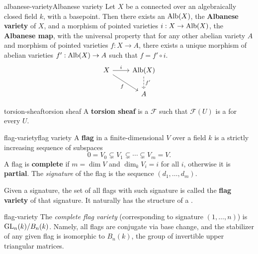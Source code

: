 \begin{topic}{albanese-variety}{Albanese variety}
    Let $X$ be a connected   over an algebraically closed field $k$, with a basepoint. Then there exists an  $\textup{Alb}(X)$, the \textbf{Albanese variety} of $X$, and a morphism of pointed varieties $i : X \to \textup{Alb}(X)$, the \textbf{Albanese map}, with the universal property that for any other abelian variety $A$ and morphism of pointed varieties $f : X \to A$, there exists a unique morphism of abelian varieties $f' : \textup{Alb}(X) \to A$ such that $f = f' \circ i$.
    \[ \begin{tikzcd} X \arrow{r}{i} \arrow[swap]{dr}{f} &  \textup{Alb}(X) \arrow[dashed]{d}{f'} \\ &  A \end{tikzcd} \]
\end{topic}

\begin{topic}{torsion-sheaf}{torsion sheaf}
    A \textbf{torsion sheaf} is a  $\mathcal{F}$ such that $\mathcal{F}(U)$ is a   for every $U$.
\end{topic}

\begin{topic}{flag-variety}{flag variety}
    A \textbf{flag} in a finite-dimensional  $V$ over a field $k$ is a strictly increasing sequence of subspaces
    \[ 0 = V_0 \subsetneq V_1 \subsetneq \cdots \subsetneq V_m = V . \]
    A flag is \textbf{complete} if $m = \dim V$ and $\dim_k V_i = i$ for all $i$, otherwise it is \textbf{partial}. The \textit{signature} of the flag is the sequence $(d_1, \ldots, d_m)$.
    
    Given a signature, the set of all flags with such signature is called the \textbf{flag variety} of that signature. It naturally has the structure of a  .
\end{topic}

\begin{example}{flag-variety}
    The \textit{complete flag variety} (corresponding to signature $(1, \ldots, n)$) is $\textup{GL}_n(k) / B_n(k)$. Namely, all flags are conjugate via base change, and the stabilizer of any given flag is isomorphic to $B_n(k)$, the group of invertible upper triangular matrices.
\end{example}

